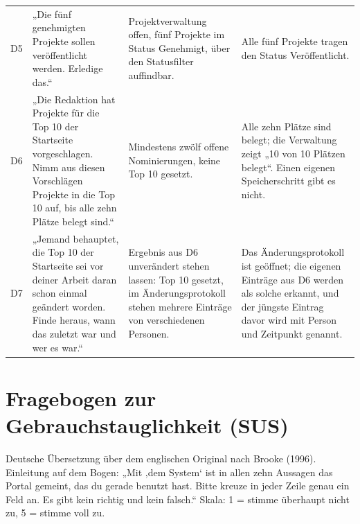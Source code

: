 \begin{longtable}{@{}L{0.6cm}L{6.1cm}L{3.8cm}L{4.2cm}@{}}
	D5 & „Die fünf genehmigten Projekte sollen veröffentlicht werden. Erledige das.“ & Projektverwaltung offen, fünf Projekte im Status Genehmigt, über den Statusfilter auffindbar. & Alle fünf Projekte tragen den Status Veröffentlicht. \\
	D6 & „Die Redaktion hat Projekte für die Top 10 der Startseite vorgeschlagen. Nimm aus diesen Vorschlägen Projekte in die Top 10 auf, bis alle zehn Plätze belegt sind.“ & Mindestens zwölf offene Nominierungen, keine Top 10 gesetzt. & Alle zehn Plätze sind belegt; die Verwaltung zeigt „10 von 10 Plätzen belegt“. Einen eigenen Speicherschritt gibt es nicht. \\
	D7 & „Jemand behauptet, die Top 10 der Startseite sei vor deiner Arbeit daran schon einmal geändert worden. Finde heraus, wann das zuletzt war und wer es war.“ & Ergebnis aus D6 unverändert stehen lassen: Top 10 gesetzt, im Änderungsprotokoll stehen mehrere Einträge von verschiedenen Personen. & Das Änderungsprotokoll ist geöffnet; die eigenen Einträge aus D6 werden als solche erkannt, und der jüngste Eintrag davor wird mit Person und Zeitpunkt genannt. \\
\end{longtable}
\endgroup

\section*{Fragebogen zur Gebrauchstauglichkeit (SUS)}

Deutsche Übersetzung über dem englischen Original nach Brooke (1996). Einleitung auf dem Bogen: „Mit ‚dem System‘ ist in allen zehn Aussagen das Portal gemeint, das du gerade benutzt hast. Bitte kreuze in jeder Zeile genau ein Feld an. Es gibt kein richtig und kein falsch.“ Skala: 1 = stimme überhaupt nicht zu, 5 = stimme voll zu.

